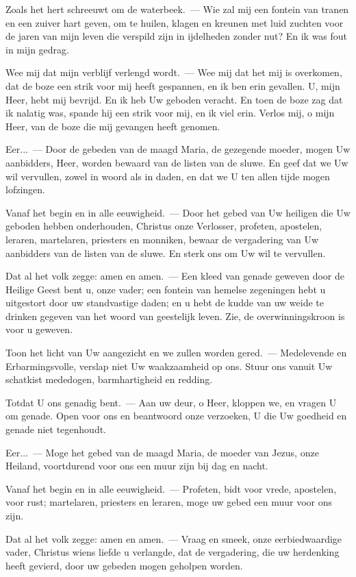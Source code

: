 \documentclass[12pt,twoside,a5paper]{article}
\begin{document}
\begin{halfparskip}
  Zoals het hert schreeuwt om de waterbeek.~--- Wie zal mij een fontein van tranen en een zuiver hart geven, om te huilen, klagen en kreunen met luid zuchten voor de jaren van mijn leven die verspild zijn in ijdelheden zonder nut? En ik was fout in mijn gedrag.

  Wee mij dat mijn verblijf verlengd wordt.~--- Wee mij dat het mij is overkomen, dat de boze een strik voor mij heeft gespannen, en ik ben erin gevallen. U, mijn Heer, hebt mij bevrijd. En ik heb Uw geboden veracht. En toen de boze zag dat ik nalatig was, spande hij een strik voor mij, en ik viel erin. Verlos mij, o mijn Heer, van
  de boze die mij gevangen heeft genomen.

  Eer...~--- Door de gebeden van de maagd Maria, de gezegende moeder, mogen Uw aanbidders, Heer, worden bewaard van de listen van de sluwe. En geef dat we Uw wil vervullen, zowel in woord als in daden, en dat we U ten allen tijde mogen lofzingen.

  Vanaf het begin en in alle eeuwigheid.~--- Door het gebed van Uw heiligen die Uw geboden hebben
  onderhouden, Christus onze Verlosser, profeten, apostelen, leraren, martelaren, priesters en monniken, bewaar de vergadering van Uw aanbidders van de listen van de sluwe. En sterk ons om Uw wil te vervullen.

  Dat al het volk zegge: amen en amen.~--- Een kleed van genade geweven door de Heilige Geest bent u, onze vader; een fontein van hemelse zegeningen hebt u uitgestort door uw standvastige daden; en u hebt de kudde van uw weide te drinken gegeven van het woord van geestelijk leven. Zie, de overwinningskroon is voor u geweven.
\end{halfparskip}


\begin{halfparskip}
  Toon het licht van Uw aangezicht en we zullen worden gered.~--- Medelevende en Erbarmingsvolle, verslap niet Uw waakzaamheid op ons. Stuur ons vanuit Uw schatkist mededogen, barmhartigheid en redding.

  Totdat U ons genadig bent.~--- Aan uw deur, o Heer, kloppen we, en vragen U om genade. Open voor ons en beantwoord onze verzoeken, U die Uw goedheid en genade niet tegenhoudt.

  Eer...~--- Moge het gebed van de maagd Maria, de moeder van Jezus, onze Heiland, voortdurend voor ons een muur zijn bij dag en nacht.

  Vanaf het begin en in alle eeuwigheid.~--- Profeten, bidt voor vrede, apostelen, voor rust; martelaren, priesters en leraren, moge uw gebed een muur voor ons zijn.

  Dat al het volk zegge: amen en amen.~--- Vraag en smeek, onze eerbiedwaardige vader, Christus wiens liefde u verlangde, dat de vergadering, die uw herdenking heeft gevierd, door uw gebeden mogen geholpen worden.
\end{halfparskip}
\end{document}
